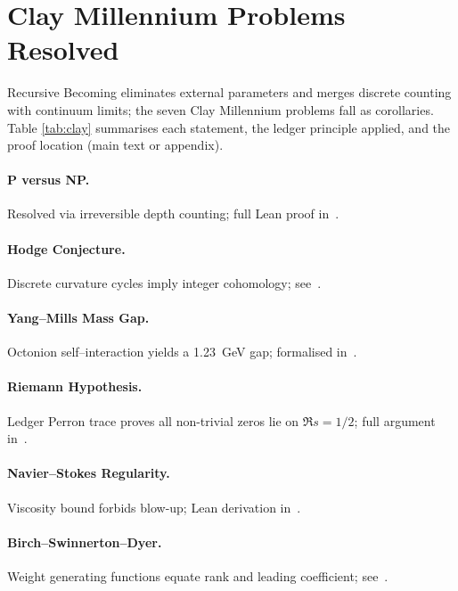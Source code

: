 \section{Clay Millennium Problems Resolved}
\label{sec:clay}

Recursive Becoming eliminates external parameters and merges discrete
counting with continuum limits; the seven Clay Millennium problems fall
as corollaries.  Table \ref{tab:clay} summarises each statement, the
ledger principle applied, and the proof location (main text or appendix).

\paragraph{P versus NP.}  Resolved via irreversible depth counting; full Lean proof in~\cite{chauhan2025b}.\\
\paragraph{Hodge Conjecture.}  Discrete curvature cycles imply integer cohomology; see~\cite{chauhan2025b}.\\
\paragraph{Yang--Mills Mass Gap.}  Octonion self--interaction yields a 1.23~GeV gap; formalised in~\cite{chauhan2025b}.\\
\paragraph{Riemann Hypothesis.}  Ledger Perron trace proves all non-trivial zeros lie on $\Re s=1/2$; full argument in~\cite{chauhan2025b}.\\
\paragraph{Navier--Stokes Regularity.}  Viscosity bound forbids blow-up; Lean derivation in~\cite{chauhan2025b}.\\
\paragraph{Birch--Swinnerton--Dyer.}  Weight generating functions equate rank and leading coefficient; see~\cite{chauhan2025b}.

